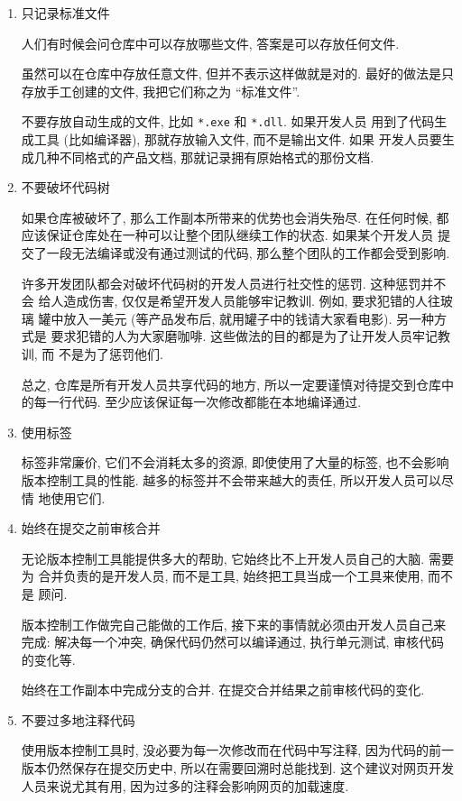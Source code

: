 \documentclass[nofonts, oneside]{ctexart}
\begin{document}
\begin{enumerate}
    \item 只记录标准文件

    人们有时候会问仓库中可以存放哪些文件, 答案是可以存放任何文件.

    虽然可以在仓库中存放任意文件, 但并不表示这样做就是对的. 最好的做法是只
    存放手工创建的文件, 我把它们称之为 ``标准文件''.

    不要存放自动生成的文件, 比如 \verb'*.exe' 和 \verb'*.dll'. 如果开发人员
    用到了代码生成工具 (比如编译器), 那就存放输入文件, 而不是输出文件. 如果
    开发人员要生成几种不同格式的产品文档, 那就记录拥有原始格式的那份文档.

    \item 不要破坏代码树

    如果仓库被破坏了, 那么工作副本所带来的优势也会消失殆尽. 在任何时候,
    都应该保证仓库处在一种可以让整个团队继续工作的状态. 如果某个开发人员
    提交了一段无法编译或没有通过测试的代码, 那么整个团队的工作都会受到影响.

    许多开发团队都会对破坏代码树的开发人员进行社交性的惩罚. 这种惩罚并不会
    给人造成伤害, 仅仅是希望开发人员能够牢记教训. 例如, 要求犯错的人往玻璃
    罐中放入一美元 (等产品发布后, 就用罐子中的钱请大家看电影). 另一种方式是
    要求犯错的人为大家磨咖啡. 这些做法的目的都是为了让开发人员牢记教训, 而
    不是为了惩罚他们.

    总之, 仓库是所有开发人员共享代码的地方, 所以一定要谨慎对待提交到仓库中
    的每一行代码. 至少应该保证每一次修改都能在本地编译通过.

    \item 使用标签

    标签非常廉价, 它们不会消耗太多的资源, 即使使用了大量的标签, 也不会影响
    版本控制工具的性能. 越多的标签并不会带来越大的责任, 所以开发人员可以尽情
    地使用它们.

    \item 始终在提交之前审核合并

    无论版本控制工具能提供多大的帮助, 它始终比不上开发人员自己的大脑. 需要为
    合并负责的是开发人员, 而不是工具, 始终把工具当成一个工具来使用, 而不是
    顾问.

    版本控制工作做完自己能做的工作后, 接下来的事情就必须由开发人员自己来完成:
    解决每一个冲突, 确保代码仍然可以编译通过, 执行单元测试, 审核代码的变化等.

    始终在工作副本中完成分支的合并. 在提交合并结果之前审核代码的变化.

    \item 不要过多地注释代码

    使用版本控制工具时, 没必要为每一次修改而在代码中写注释, 因为代码的前一
    版本仍然保存在提交历史中, 所以在需要回溯时总能找到. 这个建议对网页开发
    人员来说尤其有用, 因为过多的注释会影响网页的加载速度.
\end{enumerate}
\end{document}
